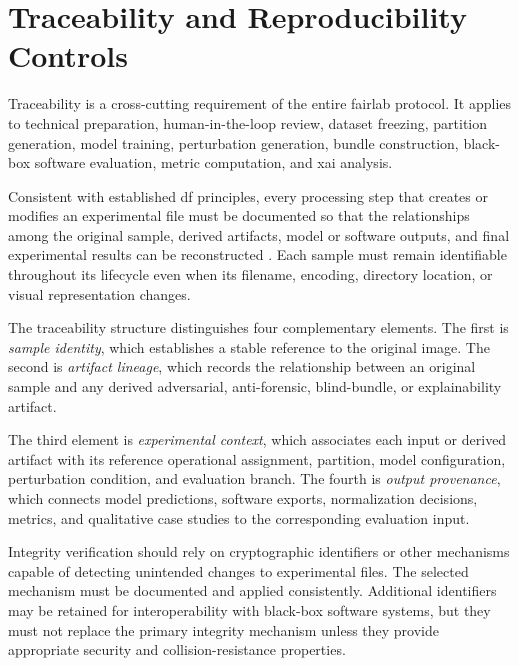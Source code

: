 \section{Traceability and Reproducibility Controls}
\label{sec:methodology-traceability-controls}

Traceability is a cross-cutting requirement of the entire \gls{fairlab}
protocol. It applies to technical preparation, human-in-the-loop review,
dataset freezing, partition generation, model training, perturbation
generation, bundle construction, black-box software evaluation, metric
computation, and \gls{xai} analysis.

Consistent with established \gls{df} principles, every processing step that
creates or modifies an experimental file must be documented so that the
relationships among the original sample, derived artifacts, model or software
outputs, and final experimental results can be reconstructed
\cite{casey2011digital,nist2006guide,iso27037}. Each sample must remain
identifiable throughout its lifecycle even when its filename, encoding,
directory location, or visual representation changes.

The traceability structure distinguishes four complementary elements. The first
is \textit{sample identity}, which establishes a stable reference to the
original image. The second is \textit{artifact lineage}, which records the
relationship between an original sample and any derived adversarial,
anti-forensic, blind-bundle, or explainability artifact.

The third element is \textit{experimental context}, which associates each input
or derived artifact with its reference operational assignment, partition, model
configuration, perturbation condition, and evaluation branch. The fourth is
\textit{output provenance}, which connects model predictions, software exports,
normalization decisions, metrics, and qualitative case studies to the
corresponding evaluation input.

Integrity verification should rely on cryptographic identifiers or other
mechanisms capable of detecting unintended changes to experimental files. The
selected mechanism must be documented and applied consistently. Additional
identifiers may be retained for interoperability with black-box software
systems, but they must not replace the primary integrity mechanism unless they
provide appropriate security and collision-resistance properties.

